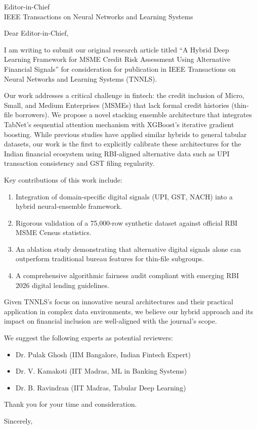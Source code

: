 \documentclass{letter}
\begin{document}
\begin{letter}{Editor-in-Chief \\ IEEE Transactions on Neural Networks and Learning Systems}

\opening{Dear Editor-in-Chief,}

I am writing to submit our original research article titled ``A Hybrid Deep Learning Framework for MSME Credit Risk Assessment Using Alternative Financial Signals'' for consideration for publication in IEEE Transactions on Neural Networks and Learning Systems (TNNLS).

Our work addresses a critical challenge in fintech: the credit inclusion of Micro, Small, and Medium Enterprises (MSMEs) that lack formal credit histories (thin-file borrowers). We propose a novel stacking ensemble architecture that integrates TabNet's sequential attention mechanism with XGBoost's iterative gradient boosting. While previous studies have applied similar hybrids to general tabular datasets, our work is the first to explicitly calibrate these architectures for the Indian financial ecosystem using RBI-aligned alternative data such as UPI transaction consistency and GST filing regularity.

Key contributions of this work include:
\begin{enumerate}
    \item Integration of domain-specific digital signals (UPI, GST, NACH) into a hybrid neural-ensemble framework.
    \item Rigorous validation of a 75,000-row synthetic dataset against official RBI MSME Census statistics.
    \item An ablation study demonstrating that alternative digital signals alone can outperform traditional bureau features for thin-file subgroups.
    \item A comprehensive algorithmic fairness audit compliant with emerging RBI 2026 digital lending guidelines.
\end{enumerate}

Given TNNLS's focus on innovative neural architectures and their practical application in complex data environments, we believe our hybrid approach and its impact on financial inclusion are well-aligned with the journal's scope.

We suggest the following experts as potential reviewers:
\begin{itemize}
    \item Dr. Pulak Ghosh (IIM Bangalore, Indian Fintech Expert)
    \item Dr. V. Kamakoti (IIT Madras, ML in Banking Systems)
    \item Dr. B. Ravindran (IIT Madras, Tabular Deep Learning)
\end{itemize}

Thank you for your time and consideration.

\closing{Sincerely,}

\end{letter}
\end{document}
